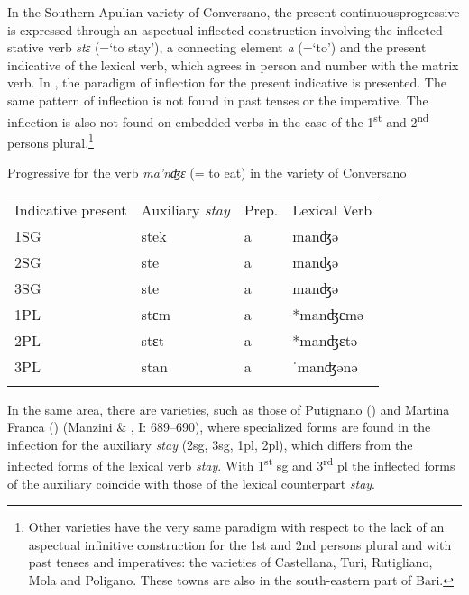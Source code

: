 \documentclass[output=paper]{langsci/langscibook}
\begin{document}
In the Southern Apulian variety of Conversano, the present continuousprogressive is expressed through an aspectual inflected construction involving the inflected stative verb \textit{stɛ} (=‘to stay’), a connecting element \textit{a} (=‘to’) and the present indicative of the lexical verb, which agrees in person and number with the matrix verb. In , the paradigm of inflection for the present indicative is presented. The same pattern of inflection is not found in past tenses or the imperative. The inflection is also not found on embedded verbs in the case of the 1\textsuperscript{st} and 2\textsuperscript{nd} persons plural.\footnote{Other varieties have the very same paradigm with respect to the lack of an aspectual infinitive construction for the 1st and 2nd persons plural and with past tenses and imperatives: the varieties of Castellana, Turi, Rutigliano, Mola and Poligano. These towns are also in the south-eastern part of Bari.} 

\begin{table}
\caption{Progressive for the verb \textit{ma’nʤɛ} (= to eat) in the variety of Conversano}
\label{tab:1}
\end{table}

\begin{tabularx}{\textwidth}{XXXX}
\lsptoprule
Indicative present & Auxiliary \textit{stay} & Prep. & Lexical Verb\\
1SG & stek & a & manʤə\\
2SG & ste & a & manʤə\\
3SG & ste & a & manʤə\\
1PL & stɛm & a & *manʤɛmə\\
2PL & stɛt & a & *manʤɛtə\\
3PL & stan & a & ˈmanʤənə\\
\lspbottomrule
\end{tabularx}
In the same area, there are varieties, such as those of Putignano () and Martina Franca () (Manzini \& \citealt{Savoia2005}, I: 689–690), where specialized forms are found in the inflection for the auxiliary \textit{stay} (2sg, 3sg, 1pl, 2pl), which differs from the inflected forms of the lexical verb \textit{stay}. With 1\textsuperscript{st} sg and 3\textsuperscript{rd} pl the inflected forms of the auxiliary coincide with those of the lexical counterpart \textit{stay}. 
\end{document}
